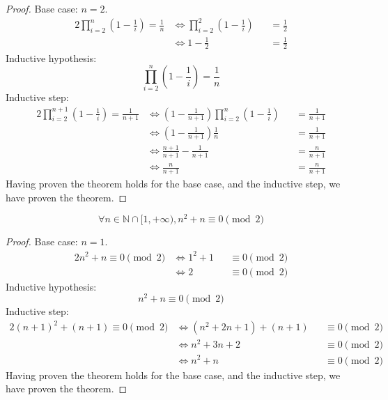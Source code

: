 \documentclass[docid=TP01]{tcom_TP}
\begin{document}
\begin{proof}
	Base case: $n=2$.
	\begin{alignat*}{2}
		\prod_{i=2}^{n}{\left(1-\frac{1}{i}\right)}=\frac{1}{n}
		&\iff \prod_{i=2}^{2}{\left(1-\frac{1}{i}\right)}&&=\frac{1}{2} \\
		&\iff 1-\frac{1}{2}                              &&=\frac{1}{2}
	\end{alignat*}
	Inductive hypothesis:
	\begin{equation*}
		\prod_{i=2}^{n}{\left(1-\frac{1}{i}\right)}=\frac{1}{n}
	\end{equation*}
	Inductive step:
	\begin{alignat*}{2}
		\prod_{i=2}^{n+1}{\left(1-\frac{1}{i}\right)}=\frac{1}{n+1}
		&\iff \left(1-\frac{1}{n+1}\right)\prod_{i=2}^{n}{\left(1-\frac{1}{i}\right)}&&=\frac{1}{n+1} \\
		&\iff \left(1-\frac{1}{n+1}\right)\frac{1}{n}                                &&=\frac{1}{n+1} \\
		&\iff \frac{n+1}{n+1}-\frac{1}{n+1}                                          &&=\frac{n}{n+1} \\
		&\iff \frac{n}{n+1}                                                          &&=\frac{n}{n+1}
	\end{alignat*}
	Having proven the theorem holds for the base case, and the inductive step, we have proven the theorem.
\end{proof}
\pagebreak
{}
\begin{theorem}
	\begin{equation*}
		\forall n \in \mathbb{N}\cap[1,+\infty),n^2+n \equiv 0 \pmod{2}
	\end{equation*}
\end{theorem}
\begin{proof}
	Base case: $n=1$.
	\begin{alignat*}{2}
		n^2+n \equiv 0 \pmod{2}
		&\iff 1^2+1 &&\equiv 0 \pmod{2} \\
		&\iff 2     &&\equiv 0 \pmod{2}
	\end{alignat*}
	Inductive hypothesis:
	\begin{equation*}
		n^2+n \equiv 0 \pmod{2}
	\end{equation*}
	Inductive step:
	\begin{alignat*}{2}
			(n+1)^2+(n+1) \equiv 0 \pmod{2}
			&\iff (n^2+2n+1)+(n+1) &&\equiv 0 \pmod{2} \\
			&\iff n^2+3n+2         &&\equiv 0 \pmod{2} \\
			&\iff n^2+n            &&\equiv 0 \pmod{2}
	\end{alignat*}
	Having proven the theorem holds for the base case, and the inductive step, we have proven the theorem.
\end{proof}
\end{document}
